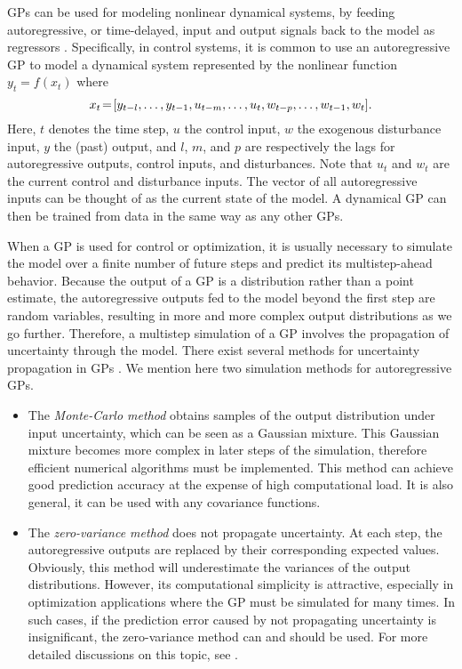 GPs can be used for modeling nonlinear dynamical systems, by feeding autoregressive, or time-delayed, input and output signals back to the model as regressors \cite{Kocijan2016}.
Specifically, in control systems, it is common to use an autoregressive GP to model a dynamical system represented by the nonlinear function
\begin{math}
y_{t} = f(x_t)
\end{math}
where
\begin{equation*}
x_{t}\!=\![y_{t-l}, \dots, y_{t-1}, u_{t-m}, \dots, u_t, w_{t-p}, \dots, w_{t-1}, w_t] \text.
\end{equation*}
Here, \(t\) denotes the time step, \(u\) the control input, \(w\) the exogenous disturbance input, \(y\) the (past) output, and \(l\), \(m\), and \(p\) are respectively the lags for autoregressive outputs, control inputs, and disturbances.
Note that \(u_t\) and \(w_t\) are the current control and disturbance inputs.
The vector of all autoregressive inputs can be thought of as the current state of the model.
A dynamical GP can then be trained from data in the same way as any other GPs.

\iffalse
When a GP is used for control or optimization, it is usually necessary to simulate the model over a finite number of future steps and predict its multistep-ahead behavior.
Because the output of a GP is a distribution rather than a point estimate, the autoregressive outputs fed to the model beyond the first step are random variables, resulting in more and more complex output distributions as we go further.
Therefore, a multistep simulation of a GP involves the propagation of uncertainty through the model.
There exist several methods for uncertainty propagation in GPs \cite{girard04approximate,Kocijan2016}. 
We mention here two simulation methods for autoregressive GPs.
\begin{itemize}
	\item The \emph{Monte-Carlo method} obtains samples of the output distribution under input uncertainty, which can be seen as a Gaussian mixture.  This Gaussian mixture becomes more complex in later steps of the simulation, therefore efficient numerical algorithms must be implemented.  This method can achieve good prediction accuracy at the expense of high computational load.  It is also general, \ie it can be used with any covariance functions.
	\item The \emph{zero-variance method} does not propagate uncertainty.  At each step, the autoregressive outputs are replaced by their corresponding expected values.  Obviously, this method will underestimate the variances of the output distributions.  However, its computational simplicity is attractive, especially in optimization applications where the GP must be simulated for many times.  In such cases, if the prediction error caused by not propagating uncertainty is insignificant, the zero-variance method can and should be used.  For more detailed discussions on this topic, see \cite{Kocijan2016,girard04approximate}.
\end{itemize}

